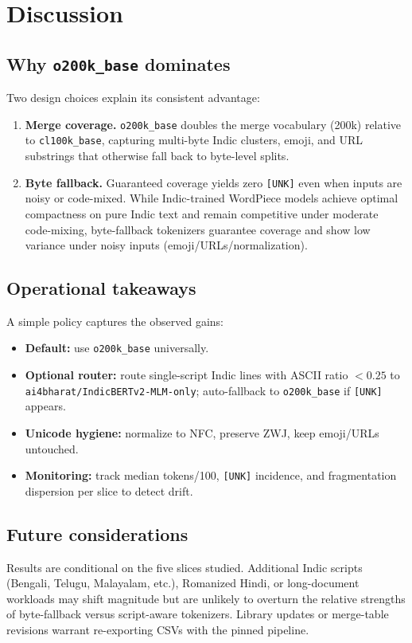 \documentclass{article}
\begin{document}

\section{Discussion}

\subsection{Why \texttt{o200k\_base} dominates}
Two design choices explain its consistent advantage:
\begin{enumerate}
    \item \textbf{Merge coverage.} \texttt{o200k\_base} doubles the merge vocabulary (200k) relative to \texttt{cl100k\_base}, capturing multi-byte Indic clusters, emoji, and URL substrings that otherwise fall back to byte-level splits.
    \item \textbf{Byte fallback.} Guaranteed coverage yields zero \texttt{[UNK]} even when inputs are noisy or code-mixed. While Indic-trained WordPiece models achieve optimal compactness on pure Indic text and remain competitive under moderate code-mixing, byte-fallback tokenizers guarantee coverage and show low variance under noisy inputs (emoji/URLs/normalization).
\end{enumerate}

\subsection{Operational takeaways}
A simple policy captures the observed gains:
\begin{itemize}
    \item \textbf{Default:} use \texttt{o200k\_base} universally.
    \item \textbf{Optional router:} route single-script Indic lines with ASCII ratio $<0.25$ to \texttt{ai4bharat/IndicBERTv2-MLM-only}; auto-fallback to \texttt{o200k\_base} if \texttt{[UNK]} appears.
    \item \textbf{Unicode hygiene:} normalize to NFC, preserve ZWJ, keep emoji/URLs untouched.
    \item \textbf{Monitoring:} track median tokens/100, \texttt{[UNK]} incidence, and fragmentation dispersion per slice to detect drift.
\end{itemize}

\subsection{Future considerations}
Results are conditional on the five slices studied. Additional Indic scripts (Bengali, Telugu, Malayalam, etc.), Romanized Hindi, or long-document workloads may shift magnitude but are unlikely to overturn the relative strengths of byte-fallback versus script-aware tokenizers. Library updates or merge-table revisions warrant re-exporting CSVs with the pinned pipeline.
\end{document}
